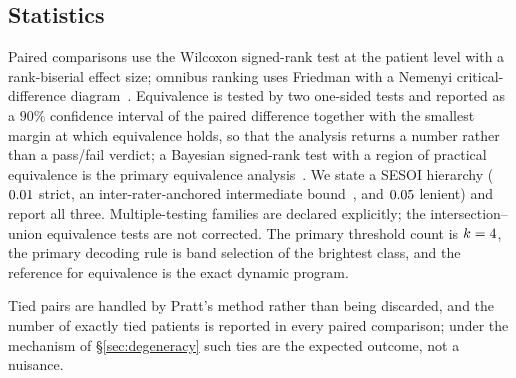 
\subsection{Statistics}

Paired comparisons use the Wilcoxon signed-rank test at the patient level with a
rank-biserial effect size; omnibus ranking uses Friedman with a Nemenyi
critical-difference diagram~\cite{demsar_cd}. Equivalence is tested by two
one-sided tests and reported as a $90\%$ confidence interval of the paired
difference together with the smallest margin at which equivalence holds, so that
the analysis returns a number rather than a pass/fail verdict; a Bayesian
signed-rank test with a region of practical equivalence is the primary
equivalence analysis~\cite{benavoli_bayes}. We state a SESOI hierarchy
($0.01$ strict, an inter-rater-anchored intermediate
bound~\cite{menze_brats}, and $0.05$ lenient) and report all three.
Multiple-testing families are declared explicitly; the intersection--union
equivalence tests are not corrected. The primary threshold count is $k=4$,
the primary decoding rule is band selection of the brightest class, and the
reference for equivalence is the exact dynamic program.

Tied pairs are handled by Pratt's method rather than being discarded, and the
number of exactly tied patients is reported in every paired comparison; under
the mechanism of §\ref{sec:degeneracy} such ties are the expected outcome, not a
nuisance.

